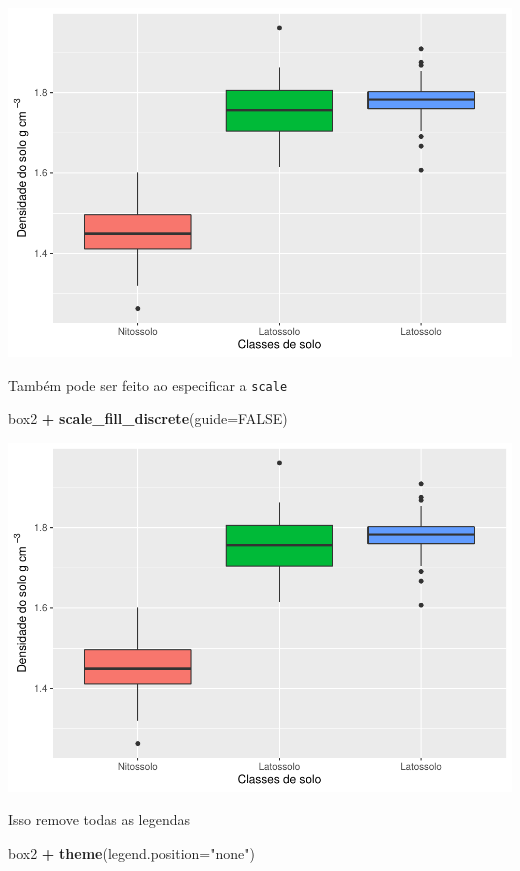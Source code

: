 \documentclass[]{book}
\newenvironment{Shaded}{\begin{snugshade}}{\end{snugshade}}
\newcommand{\DataTypeTok}[1]{\textcolor[rgb]{0.13,0.29,0.53}{#1}}
\newcommand{\KeywordTok}[1]{\textcolor[rgb]{0.13,0.29,0.53}{\textbf{#1}}}
\newcommand{\NormalTok}[1]{#1}
\newcommand{\OperatorTok}[1]{\textcolor[rgb]{0.81,0.36,0.00}{\textbf{#1}}}
\newcommand{\OtherTok}[1]{\textcolor[rgb]{0.56,0.35,0.01}{#1}}
\newcommand{\StringTok}[1]{\textcolor[rgb]{0.31,0.60,0.02}{#1}}
\begin{document}
\includegraphics{TudodoR_files/figure-latex/unnamed-chunk-208-1.pdf}

Também pode ser feito ao especificar a \texttt{scale}

\begin{Shaded}
\begin{Highlighting}[]
\NormalTok{box2 }\OperatorTok{+}\StringTok{ }\KeywordTok{scale_fill_discrete}\NormalTok{(}\DataTypeTok{guide=}\OtherTok{FALSE}\NormalTok{)}
\end{Highlighting}
\end{Shaded}

\includegraphics{TudodoR_files/figure-latex/unnamed-chunk-209-1.pdf}

Isso remove todas as legendas

\begin{Shaded}
\begin{Highlighting}[]
\NormalTok{box2 }\OperatorTok{+}\StringTok{ }\KeywordTok{theme}\NormalTok{(}\DataTypeTok{legend.position=}\StringTok{"none"}\NormalTok{)}
\end{Highlighting}
\end{Shaded}
\end{document}

